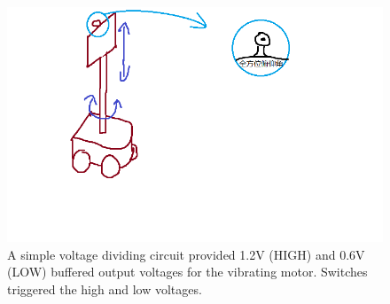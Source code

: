 \begin{figure}[h] 
        \begin{center}
                \includegraphics[width= \figwidth]{Figures/ch5.cfp.png}
        \end{center}
        \caption[voltage divider]{A simple voltage dividing circuit provided 1.2V (HIGH) and 0.6V (LOW) buffered output voltages for the vibrating motor. Switches triggered the high and low voltages. }
        \label{fig:tactile_circuit}  




\end{figure}

